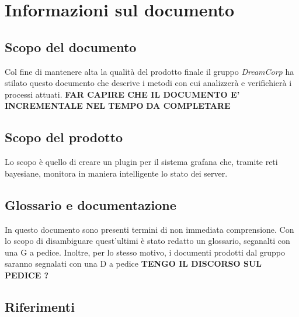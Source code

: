\section{Informazioni sul documento}
\subsection{Scopo del documento}
 Col fine di mantenere alta la qualità del prodotto finale il gruppo \textit{DreamCorp} ha stilato questo documento che descrive i metodi con cui analizzerà e verifichierà i processi attuati. \textbf{FAR CAPIRE CHE IL DOCUMENTO E' INCREMENTALE NEL TEMPO}
 \textbf{DA COMPLETARE}
 \subsection{Scopo del prodotto}
 Lo scopo è quello di creare un plugin per il sistema grafana che, tramite reti bayesiane, monitora in maniera intelligente lo stato dei server.
 \subsection{Glossario e documentazione}
 In questo documento sono presenti termini di non immediata comprensione. Con lo scopo di disambiguare quest'ultimi è stato redatto un glossario, seganalti con una G a pedice.
 Inoltre, per lo stesso motivo, i documenti prodotti dal gruppo saranno segnalati con una D a pedice \textbf{TENGO IL DISCORSO SUL PEDICE ? }
 \newpage
 \subsection{Riferimenti}
